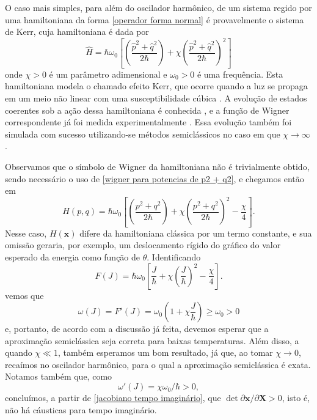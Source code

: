 \documentclass[
	12pt,
	oneside,			%
	a4paper,			%
	english,			%
	brazil				%
	]{abntex2}
\theoremstyle{definition}
\begin{document}
O caso mais simples, para além do oscilador harmônico, de um sistema regido por uma hamiltoniana da forma \eqref{operador forma normal} é provavelmente o sistema de Kerr, cuja hamiltoniana é dada por
\begin{equation}
    \hat{H} = \hbar \omega_0 \left[ \left( \frac{\hat{p}^2+\hat{q}^2}{2\hbar} \right) + \chi \left( \frac{\hat{p}^2+\hat{q}^2}{2\hbar} \right)^2 \right]
\end{equation}
onde $\chi>0$ é um parâmetro adimensional e $\omega_0>0$ é uma frequência. Esta hamiltoniana modela o chamado efeito Kerr, que ocorre quando a luz se propaga em um meio não linear com uma susceptibilidade cúbica \cite{haroche2006exploring}. A evolução de estados coerentes sob a ação dessa hamiltoniana é conhecida \cite{PhysRevLett.57.13,AVERBUKH1989449}, e a função de Wigner correspondente já foi medida experimentalmente \cite{kirchmair2013observation}. Essa evolução também foi simulada com sucesso utilizando-se métodos semiclássicos no caso em que $\chi \to \infty$ \cite{PhysRevA.99.042125}. 

Observamos que o símbolo de Wigner da hamiltoniana não é trivialmente obtido, sendo necessário o uso de \eqref{wigner para potencias de p2 + q2}, e chegamos então em
\begin{equation}
    H(p,q) = \hbar \omega_0 \left[ \left( \frac{p^2 + q^2}{2\hbar} \right) + \chi \left( \frac{p^2 + q^2}{2\hbar} \right)^2 - \frac{\chi}{4} \right].
\end{equation}
Nesse caso, $H(\mathbf{x})$ difere da hamiltoniana clássica por um termo constante, e sua omissão geraria, por exemplo, um deslocamento rígido do gráfico do valor esperado da energia como função de $\theta$. Identificando
\begin{equation}
    F(J) = \hbar\omega_0 \left[ \frac{J}{\hbar} + \chi\left(\frac{J}{\hbar} \right)^2 - \frac{\chi}{4} \right].
\end{equation}
vemos que 
\begin{equation}
    \omega(J) = F'(J) = \omega_0 \left( 1 + \chi \frac{J}{\hbar} \right) \ge \omega_0 > 0
\end{equation}
e, portanto, de acordo com a discussão já feita, devemos esperar que a aproximação semiclássica seja correta para baixas temperaturas. Além disso, a quando $\chi \ll 1$, também esperamos um bom resultado, já que, ao tomar $\chi \to 0$, recaímos no oscilador harmônico, para o qual a aproximação semiclássica é exata. Notamos também que, como 
\begin{equation}
    \omega'(J) = \chi \omega_0/\hbar > 0,
\end{equation}
concluímos, a partir de \eqref{jacobiano tempo imaginário}, que $\det \partial \mathbf{x}/ \partial \mathbf{X} >0$, isto é, não há cáusticas para tempo imaginário.
\end{document}
